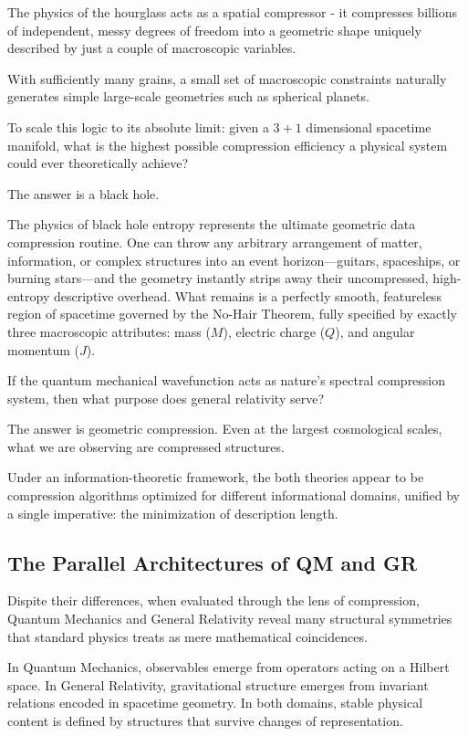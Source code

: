 The physics of the hourglass acts as a spatial compressor - it compresses billions of independent, messy degrees of freedom into a geometric shape uniquely described by just a couple of macroscopic variables.

With sufficiently many grains, a small set of macroscopic constraints naturally generates simple large-scale geometries such as spherical planets.

To scale this logic to its absolute limit: given a $3+1$ dimensional spacetime manifold, what is the highest possible compression efficiency a physical system could ever theoretically achieve?

The answer is a black hole.

The physics of black hole entropy represents the ultimate geometric data compression routine.
One can throw any arbitrary arrangement of matter, information, or complex structures into an event horizon—guitars, spaceships, or burning stars—and the geometry instantly strips away their uncompressed, high-entropy descriptive overhead.
What remains is a perfectly smooth, featureless region of spacetime governed by the No-Hair Theorem, fully specified by exactly three macroscopic attributes: mass ($M$), electric charge ($Q$), and angular momentum ($J$). 

If the quantum mechanical wavefunction acts as nature's spectral compression system, then what purpose does general relativity serve?

The answer is geometric compression. Even at the largest cosmological scales, what we are observing are compressed structures.

Under an information-theoretic framework, the both theories appear to be compression algorithms optimized for different informational domains, unified by a single imperative:
the minimization of description length.


\subsection*{The Parallel Architectures of QM and GR}

Dispite their differences, when evaluated through the lens of compression, Quantum Mechanics and General Relativity reveal many structural symmetries that standard physics treats as mere mathematical coincidences.

In Quantum Mechanics, observables emerge from operators acting on a Hilbert space.
In General Relativity, gravitational structure emerges from invariant relations encoded in spacetime geometry.
In both domains, stable physical content is defined by structures that survive changes of representation.

